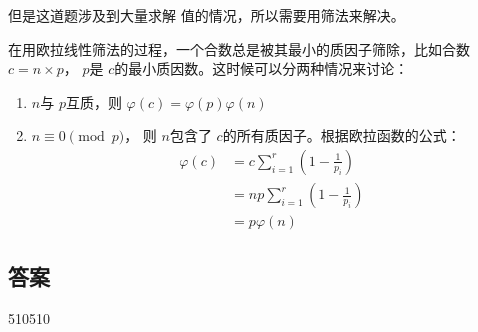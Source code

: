 但是这道题涉及到大量求解 \varphi 值的情况，所以需要用筛法来解决。

在用欧拉线性筛法的过程，一个合数总是被其最小的质因子筛除，比如合数 \( c = n  \times p\)， \( p \)是   \( c
\)的最小质因数。这时候可以分两种情况来讨论：
\begin{enumerate}
	\item \( n \)与 \( p \)互质，则 \( \varphi(c) = \varphi(p)\varphi(n) \)
	\item \( n \equiv 0 \pmod{p} \)， 则 \( n \)包含了 \( c \)的所有质因子。根据欧拉函数的公式：
	      \begin{align*}
		      \varphi(c) & = c \sum_{i=1}^{r}(1 - \frac{1}{p_i}) \\
		                 & = np \sum_{i=1}^{r}(1- \frac{1}{p_i}) \\
		                 & = p \varphi(n)
	      \end{align*}
\end{enumerate}

\subsection{答案}
510510
